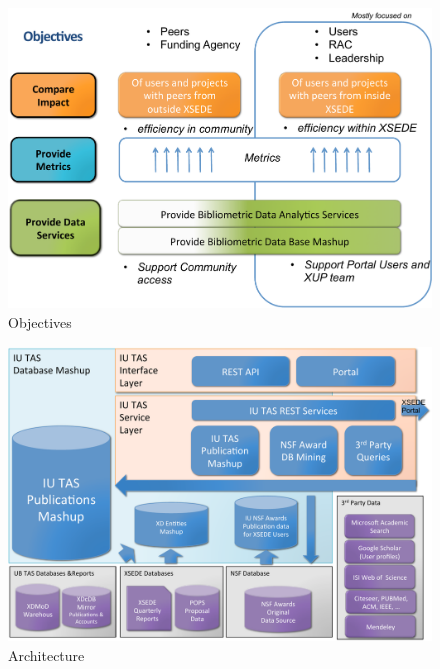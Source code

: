 \documentclass{sig-alternate}
\begin{document}
\begin{figure}[htb] 
  \centering 
    \includegraphics[width=1.0\columnwidth]{images-new/objectives.pdf} 
  \caption{Objectives}\label{F:objectives} 
\end{figure} 
 
\begin{figure}[htb] 
  \centering 
    \includegraphics[width=1.0\columnwidth]{images-new/architecture.pdf} 
  \caption{Architecture}\label{F:architecture} 
\end{figure} 
\end{document}
